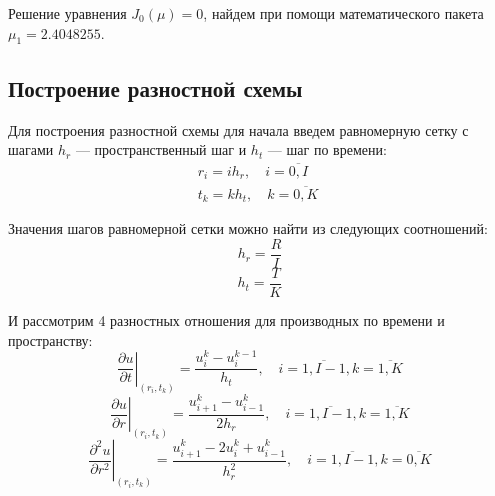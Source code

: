 \documentclass[a4paper,14pt,russian, fleqn]{extreport}
\begin{document}
	Решение уравнения $J_0(\mu) = 0$, найдем при помощи математического пакета $\mu_1 = 2.4048255$.
	\subsection{Построение разностной схемы}
	
	Для построения разностной схемы для начала введем равномерную сетку с шагами $h_r$ --- пространственный шаг и $h_t$ --- шаг по времени:	
	\begin{equation}
	\begin{array}{l}
	r_i = ih_r, \quad i = \overline{0,I} \quad \\                         
	t_k = kh_t, \quad k = \overline{0,K}
	\end{array}
	\label{eq:grid}
	\end{equation}
	
	Значения шагов равномерной сетки можно найти из следующих соотношений:	
	\begin{equation*}
	h_r = \dfrac{R}{I}
	\end{equation*}	
	\begin{equation*}
	h_t = \dfrac{T}{K}
	\end{equation*}

	И рассмотрим 4 разностных отношения для производных по времени и пространству:	
	\begin{equation*}
	\left.\dfrac{\partial u}{\partial t}\right|_{(r_i,t_k)} = \dfrac{u_i^k-u_i^{k-1}}{h_t}, \quad i = \overline{1, I-1}, k = \overline{1,K}
	\end{equation*}	
	\begin{equation*}
	\left.\dfrac{\partial u}{\partial r}\right|_{(r_i, t_k)} = \dfrac{u_{i+1}^k - u_{i-1}^k}{2h_r}, \quad i = \overline{1,I-1}, k = \overline{1,K}
	\end{equation*}	
	\begin{equation*}
	\left.\dfrac{\partial^2 u}{\partial r^2}\right|_{(r_i, t_k)} = \dfrac{u_{i+1}^k - 2u_i^k + u_{i-1}^k}{h^2_r}, \quad i = \overline{1,I-1}, k = \overline{0,K}
	\end{equation*}
	
\end{document}
